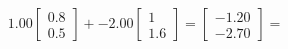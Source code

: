 \documentclass[preview]{standalone}
\begin{document}
\begin{align*}
1.00 \begin{bmatrix} 0.8 \\ 0.5 \end{bmatrix} + -2.00 \begin{bmatrix} 1 \\ 1.6 \end{bmatrix} = \begin{bmatrix} -1.20 \\ -2.70 \end{bmatrix} =
\end{align*}
\end{document}
